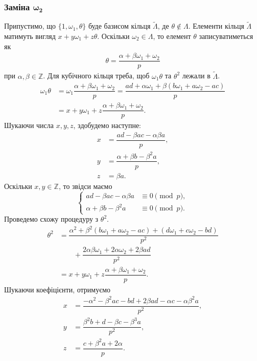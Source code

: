 \documentclass{thesis}
\begin{document}
\subsubsection{Заміна $\boldsymbol{\omega_2}$} Припустимо, що $\{1,\omega_1,\theta\}$ буде базисом кільця $\tilde{\Lambda}$, де $\theta \notin \Lambda$. Елементи кільця $\tilde{\Lambda}$ матимуть вигляд $x + y \omega_1 + z \theta$. Оскільки $\omega_2 \in \Lambda$, то елемент $\theta$ записуватиметься як
\begin{align*}
\theta = \dfrac{\alpha + \beta \omega_1 + \omega_2}{p}
\end{align*}
при $\alpha,\beta \in \mathbb{Z}$. Для кубічного кільця треба, щоб $\omega_1 \theta$ та $\theta^2$ лежали в $\tilde{\Lambda}$.
\begin{align*}
\omega_1 \theta & = \omega_1 \dfrac{\alpha + \beta \omega_1 + \omega_2}{p} = \dfrac{ad + \alpha \omega_1 + \beta (b\omega_1 + a\omega_2 - ac)}{p} \\
& = x + y \omega_1 + z \dfrac{\alpha + \beta \omega_1 + \omega_2}{p}.
\end{align*}
Шукаючи числа $x,y,z$, здобудемо наступне:
\begin{align*}
x & = \dfrac{ad - \beta ac - \alpha \beta a}{p}, \\
y & = \dfrac{\alpha + \beta b - \beta^2 a}{p}, \\
z & = \beta a.
\end{align*}
Оскільки $x,y \in \mathbb{Z}$, то звідси маємо
\begin{equation*}
\begin{cases}
ad - \beta ac - \alpha \beta a & \equiv 0 \pmod p, \\
\alpha + \beta b - \beta^2 a & \equiv 0 \pmod p.
\end{cases}
\end{equation*}
Проведемо схожу процедуру з $\theta^2$.
\begin{align*}
\theta^2 & = \dfrac{\alpha^2 + \beta^2 (b \omega_1 + a \omega_2 - ac) + (d \omega_1 + c \omega_2 - bd)}{p^2} \\
& \qquad + \dfrac{2 \alpha \beta \omega_1 + 2 \alpha \omega_2 + 2 \beta ad}{p^2} \\
& = x + y \omega_1 + z \dfrac{\alpha + \beta \omega_1 + \omega_2}{p}.
\end{align*}
Шукаючи коефіцієнти, отримуємо
\begin{align*}
x & = \dfrac{-\alpha^2 - \beta^2 ac - bd + 2 \beta a d - \alpha c - \alpha \beta^2 a}{p^2}, \\
y & = \dfrac{\beta^2 b + d - \beta c - \beta^3 a}{p^2}, \\
z & = \dfrac{c +\beta^2 a + 2\alpha}{p}.
\end{align*}
\end{document}
